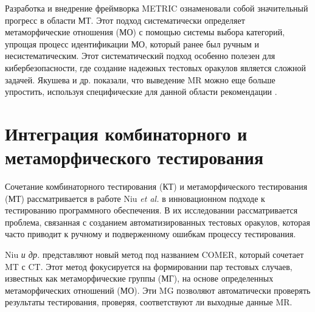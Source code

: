 Разработка и внедрение фреймворка METRIC \cite{ChenPoon2016} ознаменовали собой значительный прогресс в области МТ. Этот подход систематически определяет метаморфические отношения (МО) с помощью системы выбора категорий, упрощая процесс идентификации МО, который ранее был ручным и несистематическим. Этот систематический подход особенно полезен для кибербезопасности, где создание надежных тестовых оракулов является сложной задачей. Якушева и др. показали, что выведение MR можно еще больше упростить, используя специфические для данной области рекомендации \cite{MetaRU}.

\section{Интеграция комбинаторного и метаморфического тестирования}\label{sec:integration-of-combinatorial-and-metamorphic-testing}

Сочетание комбинаторного тестирования (КТ) и метаморфического тестирования (МТ) рассматривается в работе Niu \textit{et al.} \cite{comer} в инновационном подходе к тестированию программного обеспечения. В их исследовании рассматривается проблема, связанная с созданием автоматизированных тестовых оракулов, которая часто приводит к ручному и подверженному ошибкам процессу тестирования.

Niu \textit{и др.} представляют новый метод под названием COMER, который сочетает MT с CT. Этот метод фокусируется на формировании пар тестовых случаев, известных как метаморфические группы (МГ), на основе определенных метаморфических отношений (МО). Эти MG позволяют автоматически проверять результаты тестирования, проверяя, соответствуют ли выходные данные MR.

\newpage
